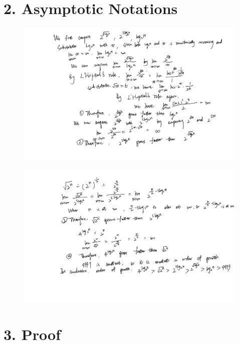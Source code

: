 \documentclass[10pt]{article}
\begin{document}
\section*{2. Asymptotic Notations}

\begin{figure}[H]
  \centering
  \includegraphics[width=\linewidth]{../assets/2_1.jpg}
\end{figure}

\begin{figure}[H]
  \centering
  \includegraphics[width=\linewidth]{../assets/2_2.jpg}
\end{figure}

\section*{3. Proof}
\end{document}

